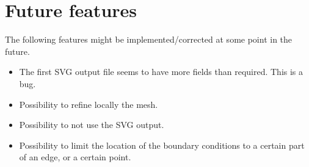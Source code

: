 \documentclass[10pt]{article}
\begin{document}










\section{Future features}

The following features might be implemented/corrected at some point in the future.

\begin{itemize}
	\item The first SVG output file seems to have more fields than required. This is a bug.
	\item Possibility to refine locally the mesh.
	\item Possibility to not use the SVG output.
	\item Possibility to limit the location of the boundary conditions to a certain part of an edge, or a certain point.
\end{itemize}
\end{document}
